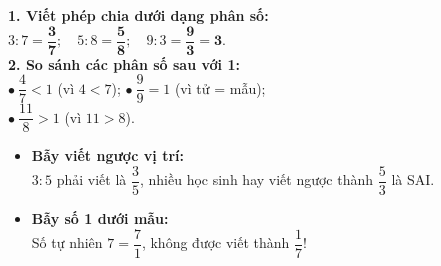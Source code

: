 \documentclass[14pt,a4paper,oneside]{extbook}
\begin{document}
\vspace{-2.5mm}
\noindent
\begin{minipage}[t]{0.49\textwidth}\vspace{0pt}
\begin{tcolorbox}[
  enhanced,
  colback=green!4!white,
  colframe=green!60!black,
  arc=2mm, boxrule=0.8pt,
  left=2mm, right=2mm, top=1.8mm, bottom=1.8mm,
  title={\footnotesize\bfseries\color{white}\faCheckCircle\ Ví dụ thực hành chuẩn mực}
]
{\footnotesize
\textbf{1. Viết phép chia dưới dạng phân số:}\\
$3 : 7 = \mathbf{\dfrac{3}{7}}; \quad 5 : 8 = \mathbf{\dfrac{5}{8}}; \quad 9 : 3 = \mathbf{\dfrac{9}{3}} = \mathbf{3}$.\\
\textbf{2. So sánh các phân số sau với 1:}\\
$\bullet~ \dfrac{4}{7} < 1$ (vì $4 < 7$); \quad $\bullet~ \dfrac{9}{9} = 1$ (vì tử = mẫu);\\
$\bullet~ \dfrac{11}{8} > 1$ (vì $11 > 8$).
}
\end{tcolorbox}
\end{minipage}
\hfill
\begin{minipage}[t]{0.49\textwidth}\vspace{0pt}
\begin{tcolorbox}[
  enhanced,
  colback=red!4!white,
  colframe=red!70!black,
  arc=2mm, boxrule=0.8pt,
  left=2mm, right=2mm, top=1.8mm, bottom=1.8mm,
  title={\footnotesize\bfseries\color{white}\faExclamationTriangle\ Mẹo tránh bẫy trắc nghiệm}
]
{\footnotesize
\begin{itemize}\setlength{\itemsep}{1.5pt}\setlength{\leftskip}{-2.5mm}
  \item \textbf{Bẫy viết ngược vị trí:}\\
  $3 : 5$ phải viết là $\dfrac{3}{5}$, nhiều học sinh hay viết ngược thành $\dfrac{5}{3}$ là SAI.
  \item \textbf{Bẫy số 1 dưới mẫu:}\\
  Số tự nhiên $7 = \dfrac{7}{1}$, không được viết thành $\dfrac{1}{7}$!
\end{itemize}
}
\end{tcolorbox}
\end{minipage}
\end{document}

